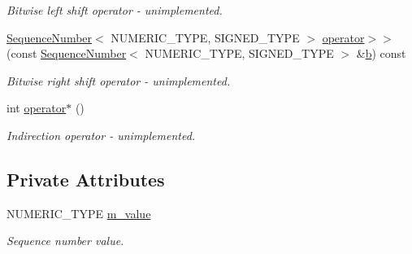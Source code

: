 \begin{DoxyCompactItemize}
\begin{DoxyCompactList}\small\item\em Bitwise left shift operator -\/ unimplemented. \end{DoxyCompactList}\item 
\hyperlink{classns3_1_1SequenceNumber}{Sequence\+Number}$<$ N\+U\+M\+E\+R\+I\+C\+\_\+\+T\+Y\+PE, S\+I\+G\+N\+E\+D\+\_\+\+T\+Y\+PE $>$ \hyperlink{classns3_1_1SequenceNumber_a487d47764b3ba7790f903701f6a60c77}{operator$>$$>$} (const \hyperlink{classns3_1_1SequenceNumber}{Sequence\+Number}$<$ N\+U\+M\+E\+R\+I\+C\+\_\+\+T\+Y\+PE, S\+I\+G\+N\+E\+D\+\_\+\+T\+Y\+PE $>$ \&\hyperlink{lte__pathloss_8m_a21ad0bd836b90d08f4cf640b4c298e7c}{b}) const 
\begin{DoxyCompactList}\small\item\em Bitwise right shift operator -\/ unimplemented. \end{DoxyCompactList}\item 
int \hyperlink{classns3_1_1SequenceNumber_afb35c1b5d95c4d88903b0470af0b3f69}{operator$\ast$} ()
\begin{DoxyCompactList}\small\item\em Indirection operator -\/ unimplemented. \end{DoxyCompactList}\end{DoxyCompactItemize}
\subsection*{Private Attributes}
\begin{DoxyCompactItemize}
\item 
N\+U\+M\+E\+R\+I\+C\+\_\+\+T\+Y\+PE \hyperlink{classns3_1_1SequenceNumber_adf80ab2f164cf0e6aa3f8c00b8e4aa91}{m\+\_\+value}
\begin{DoxyCompactList}\small\item\em Sequence number value. \end{DoxyCompactList}\end{DoxyCompactItemize}
